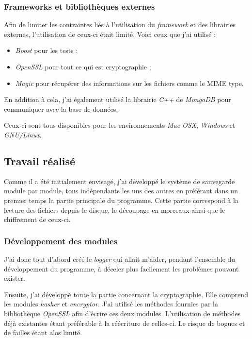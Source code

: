 \documentclass[a4paper,10pt, twoside]{report}
\begin{document}
\begin{spacing}{1.2}
\subsubsection{Frameworks et bibliothèques externes}

Afin de limiter les contraintes liés à l'utilisation du \textit{framework}
et des librairies externes, l'utilisation de ceux-ci était limité. Voici
ceux que j'ai utilisé :
\begin{itemize}
 \item \textit{Boost} pour les tests ;
 \item \textit{OpenSSL} pour tout ce qui est cryptographie ;
 \item \textit{Magic} pour récupérer des informations sur les fichiers
 comme le MIME type.
\end{itemize}

En addition à cela, j'ai également utilisé la librairie \textit{C++} de
\textit{MongoDB} pour communiquer avec la base de données.

Ceux-ci sont tous disponibles pour les environnements \textit{Mac OSX},
\textit{Windows} et \textit{GNU/Linux}.

\subsection{Travail réalisé}

Comme il a été initialement envisagé, j'ai développé le système de
sauvegarde module par module, tous indépendants les uns des autres en
préférant dans un premier temps la partie principale du programme. Cette
partie correspond à la lecture des fichiers depuis le disque, le découpage
en morceaux ainsi que le chiffrement de ceux-ci.

\subsubsection{Développement des modules}

J'ai donc tout d'abord créé le \textit{logger} qui allait m'aider, pendant
l'ensemble du développement du programme, à déceler plus facilement les
problèmes pouvant exister.

Ensuite, j'ai développé toute la partie concernant la
cryptographie. Elle comprend les modules \textit{hasher} et
\textit{encryptor}. J'ai utilisé les méthodes fournies par la bibliothèque
\textit{OpenSSL} afin d'écrire ces deux modules. L'utilisation de méthodes
déjà existantes étant préférable à la réécriture de celles-ci.
Le risque de bogues et de failles étant alos limité.


\end{spacing}
\end{document}
